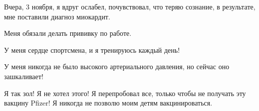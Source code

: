 Вчера, 3 ноября, я вдруг ослабел, почувствовал, что теряю сознание, в
результате, мне поставили диагноз миокардит.

Меня обязали делать прививку по работе.

У меня сердце спортсмена, и я тренируюсь каждый день!

У меня никогда не было высокого артериального давления, но сейчас оно
зашкаливает!

Я так зол! Я не хотел этого! Я перепробовал все, только чтобы не получать эту
вакцину Pfizer! Я никогда не позволю моим детям вакцинироваться.

